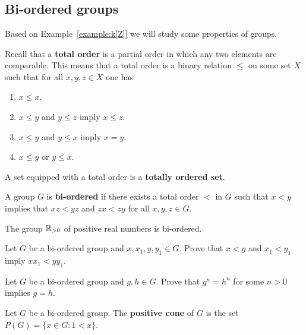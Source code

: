 \chapter{}



\section{Bi-ordered groups}

Based on Example~\ref{example:k[Z]} we will study 
some properties of groups. 

Recall that a \textbf{total order} is a partial order in which any two elements are comparable. This
means that a total order is a binary relation $\leq$ on some set $X$ 
such that for all $x,y,z\in X$ one has 
\begin{enumerate}
    \item $x\leq x$.
    \item $x\leq y$ and $y\leq z$ imply $x\leq z$.
    \item $x\leq y$ and $y\leq x$ imply $x=y$.
    \item $x\leq y$ or $y\leq x$. 
\end{enumerate}
A set equipped with a total order is a \textbf{totally ordered set}. 

\begin{definition}
	A group $G$ is \textbf{bi-ordered} if there exists a total order 
	$<$ in $G$
	such that $x<y$ implies that $xz<yz$ and $zx<zy$ for all $x,y,z\in G$.
\end{definition}

\begin{example}
	The group $\mathbb{R}_{>0}$ of positive real numbers is bi-ordered. 
\end{example}

\begin{exercise}
	Let $G$ be a bi-ordered group and $x,x_1,y,y_1\in G$. Prove that
	$x<y$ and $x_1<y_1$ imply $xx_1<yy_1$.
\end{exercise}

\begin{exercise}
	Let $G$ be a bi-ordered group and $g,h\in G$. Prove that $g^n=h^n$
	for some $n>0$ implies $g=h$.
\end{exercise}

\begin{definition}
	Let $G$ be a bi-ordered group. The \textbf{positive cone} of $G$  
	is the set $P(G)=\{x\in
	G:1<x\}$.
\end{definition}

